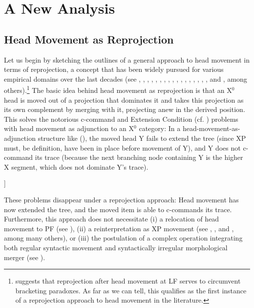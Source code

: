 \documentclass[output=paper
,modfonts
,nonflat]{langsci/langscibook}
\begin{document}
\section{A New Analysis}

\subsection{Head Movement as Reprojection}

Let us begin by sketching the outlines of a general approach to head
movement in terms of reprojection, a concept that has been widely
pursued for various empirical domains over the last decades (see
\cite{Pesetsky:85}, \cite{Stechow&Sternefeld:88},
\cite{Sternefeld:89}, \cite{Holmberg:91}, \cite{Ackemaetal:93},
\cite{Kiss:95}, \cite{Koeneman:00}, \cite{Haider:00:bra},
\cite{Bhatt:02}, \cite{Hornstein&Uriagereka:02},
\cite{Fanselow:03,Fanselow:09:boo}, \cite{Bury:03}, \cite{Suranyi:05},
\cite{Donati:06}, \cite{Bayer&Brandner:08},
\cite{Georgi&Mueller:10:rep}, \cite{Mueller:11:loc}, and
, among others).\footnote{\cite{Pesetsky:85}
  suggests that reprojection after head movement at LF serves to
  circumvent bracketing paradoxes. As far as we can tell, this
  qualifies as the first instance of a reprojection approach to head
  movement in the literature.} The basic idea behind head movement as
reprojection is that an X$^0$ head is moved out of a projection that dominates it 
and takes this projection as its own complement by merging with it,
  projecting anew in the derived position. This solves the notorious
  c-command and Extension Condition (cf. \cite{Chomsky:95}) problems with head movement as
  adjunction to an X$^0$ category: In a head-movement-as-adjunction structure like (\Next),
the moved head Y fails to extend the tree (since XP must, be
definition, have been in place before movement of Y), and Y does not
c-command its trace (because the next branching node containing Y is
the higher X segment, which does not dominate Y's trace).

\ea\label{ex:mueller:23}\relax [XP [X Y$\_$1 X~] [WP ... t$\_$1 ...~]]\z

These problems disappear under a reprojection approach:  Head movement has now extended the
  tree, and the moved item is able to c-commands its
  trace. Furthermore, this approach does not 
  necessitate (i) a relocation of head movement to PF (see
  \cite{Chomsky:00}), (ii) a
  reinterpretation as XP movement (see \cite{Koopman&Szabolcsi:00}, \cite{Mahajan:01},
  and \cite{Nilsen:03:diss}, among many others), or (iii) the
  postulation of a complex
  operation integrating both regular syntactic movement and
  syntactically irregular morphological merger (see
  \cite{Matushansky:06}). 
\end{document}
